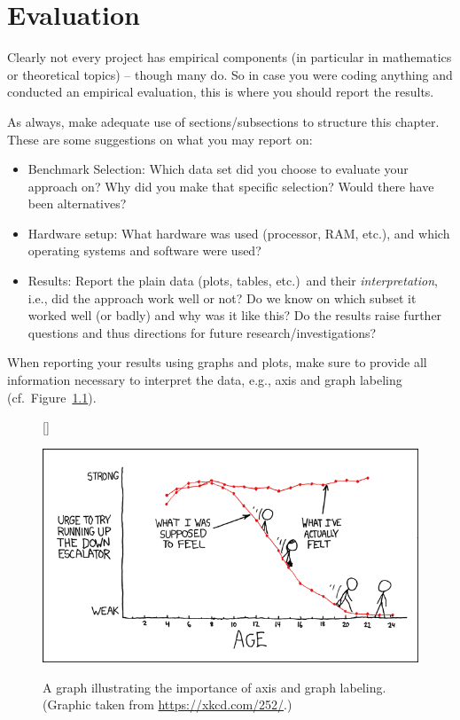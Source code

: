\chapter{Evaluation}\label{chap:evaluation}

Clearly not every project has empirical components (in particular in mathematics or theoretical topics) -- though many do. So in case you were coding anything and conducted an empirical evaluation, this is where you should report the results.

As always, make adequate use of sections/subsections to structure this chapter. 
These are some suggestions on what you may report on:
\begin{itemize}
  \item Benchmark Selection: Which data set did you choose to evaluate your approach on? Why did you make that specific selection? Would there have been alternatives?
  \item Hardware setup: What hardware was used (processor, RAM, etc.), and which operating systems and software were used?
  \item Results: Report the plain data (plots, tables, etc.)\ and their \emph{interpretation}, i.e., did the approach work well or not? Do we know on which subset it worked well (or badly) and why was it like this? Do the results raise further questions and thus directions for future research/investigations?
\end{itemize}

When reporting your results using graphs and plots, make sure to provide all information necessary to interpret the data, e.g., axis and graph labeling (cf.~Figure~\ref{fig:xkcd}).


  \begin{figure}[bh!]
  [\FBwidth]
  {\caption{A graph illustrating the importance of axis and graph labeling. (Graphic taken from \url{https://xkcd.com/252/}.)\label{fig:xkcd}}}
  {\includegraphics[width=.5\textwidth]{figures/escalators.png}}
  \end{figure}


